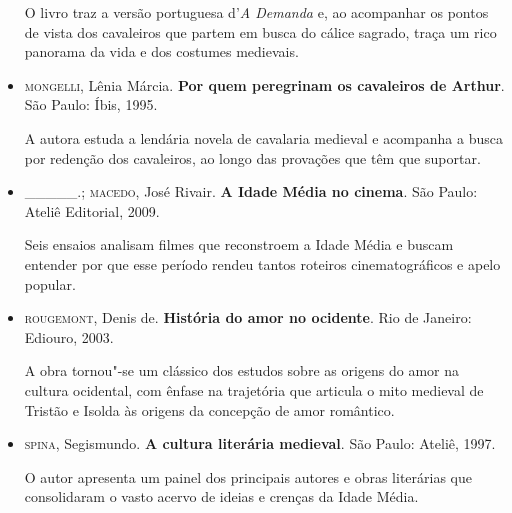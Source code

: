 \documentclass{extarticle}
\begin{document}
\begin{itemize}
  O livro traz a versão portuguesa d'\emph{A Demanda} e, ao acompanhar
  os pontos de vista dos cavaleiros que partem em busca do cálice
  sagrado, traça um rico panorama da vida e dos costumes medievais.

\item\textsc{mongelli}, Lênia Márcia. \textbf{Por quem peregrinam os cavaleiros de
Arthur}. São Paulo: Íbis, 1995.

  A autora estuda a lendária novela de cavalaria medieval e acompanha a
  busca por redenção dos cavaleiros, ao longo das provações que têm que
  suportar.

\item\_\_\_\_\_.; \textsc{macedo}, José Rivair. \textbf{A Idade Média no cinema}. São
Paulo: Ateliê Editorial, 2009.

  Seis ensaios analisam filmes que reconstroem a Idade Média e buscam
  entender por que esse período rendeu tantos roteiros cinematográficos
  e apelo popular.

\item\textsc{rougemont}, Denis de. \textbf{História do amor no ocidente}. Rio de
Janeiro: Ediouro, 2003.

  A obra tornou"-se um clássico dos estudos sobre as origens do amor na
  cultura ocidental, com ênfase na trajetória que articula o mito
  medieval de Tristão e Isolda às origens da concepção de amor
  romântico.

\item\textsc{spina}, Segismundo. \textbf{A cultura literária medieval}. São Paulo:
Ateliê, 1997.

  O autor apresenta um painel dos principais autores e obras literárias
  que consolidaram o vasto acervo de ideias e crenças da Idade Média.
\end{itemize}
\end{document}
